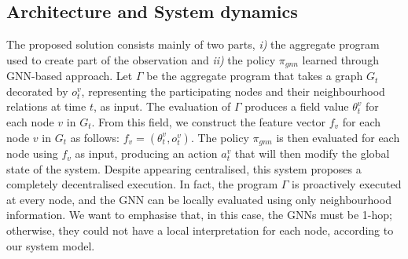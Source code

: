 \documentclass[conference]{IEEEtran}
\begin{document}
\subsection{Architecture and System dynamics}
The proposed solution consists mainly of two parts, 
\emph{i)} the aggregate program used to create part of the observation and 
\emph{ii)} the policy $\pi_{gnn}$ learned through \ac{GNN}-based approach. 
%
Let $\Gamma$ be the aggregate program that takes a graph $G_t$ decorated by $o^v_t$, 
 representing the participating nodes and their neighbourhood relations at time $t$, as input. 
%
The evaluation of $\Gamma$ produces a field value $\theta^v_t$ for each node $v$ in $G_t$. 
From this field, we construct the feature vector $f_v$ for each node $v$ in $G_t$ as follows:
 $f_v = (\theta^v_t, o^v_t)$. 
%
The policy $\pi_{gnn}$ is then evaluated for each node using $f_v$ as input, 
 producing an action $a^v_t$ that will then modify the global state of the system.
%
Despite appearing centralised, this system proposes a completely decentralised execution. 
%
In fact, the program $\Gamma$ is proactively executed at every node, 
and the \ac{GNN} can be locally evaluated using only neighbourhood information. 
%
We want to emphasise that, in this case, the \acp{GNN} must be 1-hop; 
otherwise, they could not have a local interpretation for each node, according to our system model.
\end{document}
